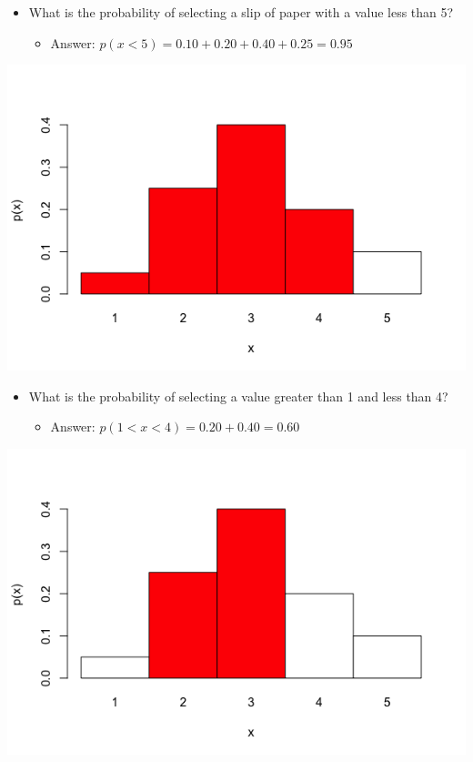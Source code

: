 \documentclass[11pt]{article}
\begin{document}
\begin{itemize}
\item What is the probability of selecting a slip of paper with a value less than 5?
\begin{itemize}
\item Answer: $p(x<5) = 0.10 + 0.20 + 0.40 + 0.25 = 0.95$
\end{itemize}
\end{itemize}

\includegraphics[width=.9\linewidth]{figures/week5/plot3.png}

\begin{itemize}
\item What is the probability of selecting a value greater than 1 and less than 4?
\begin{itemize}
\item Answer: $p(1 < x < 4) = 0.20 + 0.40 = 0.60$
\end{itemize}
\end{itemize}

\includegraphics[width=.9\linewidth]{figures/week5/plot4.png}  
\end{document}
